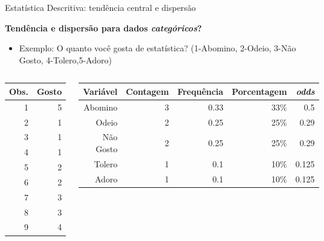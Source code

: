 \documentclass{beamer}\usepackage[]{graphicx}\usepackage[]{color}
\begin{document}
\begin{frame}{Estatística Descritiva: tendência central e dispersão}
\linespread{1.5} 
 
\textbf{Tendência e dispersão para dados \emph{categóricos}?}

\begin{small}
\begin{itemize}
  \item Exemplo: O quanto você gosta de estatística? (1-Abomino, 2-Odeio, 3-Não Gosto, 4-Tolero,5-Adoro)
\end{itemize}
\end{small}

\begin{columns}[c]
\begin{tiny}
\begin{table}[ht]
\centering
\begin{tabular}{rr}
  \hline
  Obs. & Gosto \\
  \hline
  1 & 5\\
  2 & 1\\
  3 & 1\\
  4 & 1\\
  5 & 2\\
  6 & 2\\
  7 & 3\\
  8 & 3\\
  9 & 4\\
  \hline
\end{tabular}
\end{table}
\end{tiny}


\begin{tiny}
\begin{table}[ht]
\centering
\begin{tabular}{rrrrr}
  \hline
  Variável & Contagem & Frequência & Porcentagem & \emph{odds}\\
  \hline
  Abomino & 3 & 0.33 & 33\% & 0.5\\
  Odeio & 2 & 0.25 & 25\% & 0.29\\
  Não Gosto & 2 & 0.25 & 25\% & 0.29\\
  Tolero & 1 & 0.1 & 10\% & 0.125\\
  Adoro & 1 & 0.1 & 10\% & 0.125\\
  \hline
\end{tabular}
\end{table}
\end{tiny}
\end{columns}
\end{frame} 
\end{document}

